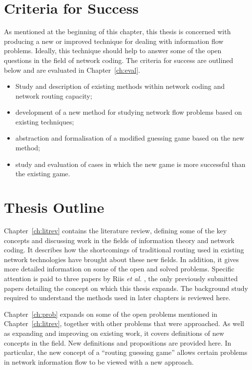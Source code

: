 \section{Criteria for Success}
\label{sect:objective}

As mentioned at the beginning of this chapter, this thesis is concerned with producing a new or improved technique for dealing with information flow problems. Ideally, this technique should help to answer some of the open questions in the field of network coding. The criteria for success are outlined below and are evaluated in Chapter~\ref{ch:eval}.

\begin{itemize}
	\item{Study and description of existing methods within network coding and network routing capacity;}
 	\item{development of a new method for studying network flow problems based on existing techniques;}
 	\item{abstraction and formalisation of a modified guessing game based on the new method;}
 	\item{study and evaluation of cases in which the new game is more successful than the existing game.}
\end{itemize}

\section{Thesis Outline}

Chapter~\ref{ch:litrev} contains the literature review, defining some of the key concepts and discussing work in the fields of information theory and network coding. It describes how the shortcomings of traditional routing used in existing network technologies have brought about these new fields. In addition, it gives more detailed information on some of the open and solved problems. Specific attention is paid to three papers by Riis \textit{et al.} \cite{riis2005util, riis2005info, came2007}, the only previously submitted papers detailing the concept on which this thesis expands. The background study required to understand the methods used in later chapters is reviewed here.

Chapter~\ref{ch:prob} expands on some of the open problems mentioned in Chapter~\ref{ch:litrev}, together with other problems that were approached. As well as expanding and improving on existing work, it covers definitions of new concepts in the field. New definitions and propositions are provided here. In particular, the new concept of a ``routing guessing game'' allows certain problems in network information flow to be viewed with a new approach.

